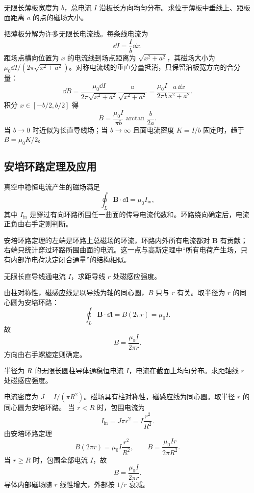\begin{example}[title={宽金属薄板可视为电流线叠加}]\label{eg:current-sheet-biot}
无限长薄板宽度为 $b$，总电流 $I$ 沿板长方向均匀分布。求位于薄板中垂线上、距板面距离 $a$ 的点的磁场大小。
\begin{solution}
把薄板分解为许多无限长电流线。每条线电流为
\[
  \dd I=\frac{I}{b}\dd x.
\]
距场点横向位置为 $x$ 的电流线到场点距离为 $\sqrt{x^2+a^2}$，其磁场大小为 $\mu_0\dd I/(2\pi\sqrt{x^2+a^2})$。对称电流线的垂直分量抵消，只保留沿板宽方向的合分量：
\[
  \dd B=\frac{\mu_0\dd I}{2\pi\sqrt{x^2+a^2}}\frac{a}{\sqrt{x^2+a^2}}
  =\frac{\mu_0 I}{2\pi b}\frac{a\,\dd x}{x^2+a^2}.
\]
积分 $x\in[-b/2,b/2]$ 得
\[
  B=\frac{\mu_0 I}{\pi b}\arctan\frac{b}{2a}.
\]
当 $b\to 0$ 时近似为长直导线场；当 $b\to\infty$ 且面电流密度 $K=I/b$ 固定时，趋于 $B=\mu_0 K/2$。
\end{solution}
\end{example}

\subsection{安培环路定理及应用}

\begin{theorem}[安培环路定理]\label{thm:ampere-law}
真空中稳恒电流产生的磁场满足
\[
  \oint_L \bm B\cdot\dd\bm l=\mu_0 I_{\mathrm{in}},
\]
其中 $I_{\mathrm{in}}$ 是穿过有向环路所围任一曲面的传导电流代数和。环路绕向确定后，电流正负由右手定则判断。
\end{theorem}

安培环路定理的左端是环路上总磁场的环流，环路内外所有电流都对 $\bm B$ 有贡献；右端只统计穿过环路所围曲面的电流。这一点与高斯定理中“所有电荷产生场，只有内部净电荷决定闭合通量”的结构相似。


\begin{example}[title={无限长直导线磁场}]\label{eg:long-wire-B}
无限长直导线通电流 $I$，求距导线 $r$ 处磁感应强度。
\begin{solution}
由柱对称性，磁感应线是以导线为轴的同心圆，$B$ 只与 $r$ 有关。取半径为 $r$ 的同心圆为安培环路：
\[
  \oint_L \bm B\cdot\dd\bm l=B(2\pi r)=\mu_0 I.
\]
故
\[
  B=\frac{\mu_0 I}{2\pi r}.
\]
方向由右手螺旋定则确定。
\end{solution}
\end{example}

\begin{example}[title={无限长载流圆柱导体的磁场}]\label{eg:current-cylinder-B}
半径为 $R$ 的无限长圆柱导体通稳恒电流 $I$，电流在截面上均匀分布。求距轴线 $r$ 处磁感应强度。
\begin{solution}
电流密度为 $J=I/(\pi R^2)$。磁场具有柱对称性，磁感应线为同心圆。取半径 $r$ 的同心圆为安培环路。
当 $r<R$ 时，包围电流为
\[
  I_{\mathrm{in}}=J\pi r^2=I\frac{r^2}{R^2}.
\]
由安培环路定理
\[
  B(2\pi r)=\mu_0 I\frac{r^2}{R^2},
  \qquad
  B=\frac{\mu_0 I r}{2\pi R^2}.
\]
当 $r\ge R$ 时，包围全部电流 $I$，故
\[
  B=\frac{\mu_0 I}{2\pi r}.
\]
导体内部磁场随 $r$ 线性增大，外部按 $1/r$ 衰减。
\end{solution}
\end{example}

